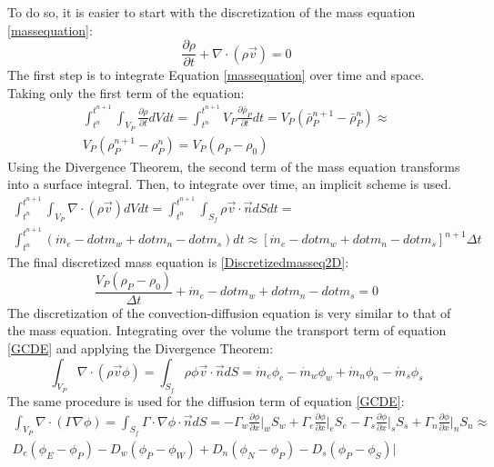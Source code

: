 To do so, it is easier to start with the discretization of the mass equation \ref{massequation}:
\begin{equation}
\frac{\partial\rho}{\partial t}+\nabla\cdot\left(\rho\vec{v}\right)=0
\label{massequation}
\end{equation}
The first step is to integrate Equation \ref{massequation} over time and space. Taking only the first term of the equation:
\begin{multline}
\int_{t^{n}}^{t^{n+1}}\int_{V_{P}}^{}\frac{\partial\rho}{\partial t}dVdt=\int_{t^{n}}^{t^{n+1}}V_{P}\frac{\partial\bar{\rho}_{P}}{\partial t}dt=V_{P}\left(\bar{\rho}_{P}^{n+1}-\bar{\rho}_{P}^{n}\right)\approx \\
V_{P}\left(\rho_{P}^{n+1}-\rho_{P}^{n}\right)=V_{P}\left(\rho_{P}-\rho_{0}\right)
\end{multline}
Using the Divergence Theorem, the second term of the mass equation transforms into a surface integral. Then, to integrate over time, an implicit scheme is used.
\begin{multline}
\int_{t^{n}}^{t^{n+1}}\int_{V_{P}}^{}\nabla\cdot\left(\rho\vec{v}\right)dVdt=\int_{t^{n}}^{t^{n+1}}\int_{S_{f}}^{}\rho\vec{v}\cdot\vec{n}dSdt= \\
\int_{t^{n}}^{t^{n+1}}\left(\dot{m}_{e}-dot{m}_{w}+dot{m}_{n}-dot{m}_{s}\right)dt\approx\left[\dot{m}_{e}-dot{m}_{w}+dot{m}_{n}-dot{m}_{s}\right]^{n+1}\Delta t
\end{multline}
The final discretized mass equation is \ref{Discretizedmasseq2D}:
\begin{equation}
\frac{V_{P}\left(\rho_{P}-\rho_{0}\right)}{\Delta t}+\dot{m}_{e}-dot{m}_{w}+dot{m}_{n}-dot{m}_{s}=0
\label{Discretizedmasseq2D}
\end{equation}
The discretization of the convection-diffusion equation is very similar to that of the mass equation. Integrating over the volume the transport term of equation \ref{GCDE} and applying the Divergence Theorem:
\begin{equation}
\int_{V_{P}}\nabla\cdot\left(\rho\vec{v}\phi\right)=\int_{S_{f}}\rho\phi\vec{v}\cdot\vec{n}dS=\dot{m}_{e}\phi_{e}-\dot{m}_{w}\phi_{w}+\dot{m}_{n}\phi_{n}-\dot{m}_{s}\phi_{s}
\end{equation}
The same procedure is used for the diffusion term of equation \ref{GCDE}:
\begin{multline}
\int_{V_{P}}\nabla\cdot\left(\Gamma\nabla\phi\right)=\int_{S_{f}}\Gamma\cdot\nabla\phi\cdot\vec{n}dS=-\Gamma_{w}\frac{\partial\phi}{\partial x}\big|_{w}S_{w}+\Gamma_{e}\frac{\partial\phi}{\partial x}\big|_{e}S_{e}-\Gamma_{s}\frac{\partial\phi}{\partial x}\big|_{s}S_{s}+\Gamma_{n}\frac{\partial\phi}{\partial x}\big|_{n}S_{n}\approx \\
D_{e}\left(\phi_{E}-\phi_{P}\right)-D_{w}\left(\phi_{P}-\phi_{W}\right)+D_{n}\left(\phi_{N}-\phi_{P}\right)-D_{s}\left(\phi_{P}-\phi_{S}\right)\big|
\end{multline}
